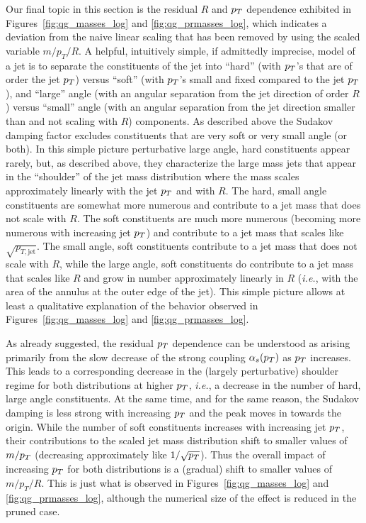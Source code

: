 Our final topic in this section is the residual $R$ and $p_T$ dependence exhibited in Figures~\ref{fig:qg_masses_log} and \ref{fig:qg_prmasses_log}, which
indicates a deviation from the naive linear scaling that has been removed by using the scaled variable $m/p_T/R$.  
A helpful, intuitively simple, if admittedly imprecise, model of a jet is to separate the constituents of the jet into ``hard'' (with $p_T$'s that are of order the jet 
$p_T$) versus ``soft'' (with $p_T$'s small and fixed compared to the jet $p_T$), and ``large'' angle (with an angular separation from the jet direction of order $R$)
versus ``small'' angle (with an angular separation from the jet direction smaller than and not scaling with $R$) components. 
As described above the Sudakov damping factor excludes constituents that are very soft or very small angle (or both).
In this simple picture 
perturbative large angle, hard constituents appear rarely, but, as described above, they characterize the large mass jets that appear in the
``shoulder'' of the jet mass distribution where the mass scales approximately linearly with the jet $p_T$ and with $R$.  
The hard, small angle constituents are somewhat more numerous
and contribute to a jet mass that does not scale with $R$.  The soft constituents are much more numerous (becoming more numerous
with increasing jet $p_T$) and contribute to a jet mass that scales like
$\sqrt{p_{T,\text{jet}}}$.  The small angle, soft constituents contribute to a jet mass that does not scale with $R$, while the large angle, soft
constituents do contribute to a jet mass that scales like $R$  and grow in number approximately linearly in $R$ (\textit{i.e.}, with the area
of the annulus at the outer edge of the jet).  This simple picture allows at least a qualitative explanation of the behavior observed in 
Figures~\ref{fig:qg_masses_log} and \ref{fig:qg_prmasses_log}.
    
As already suggested, the residual $p_T$ dependence can be understood as arising primarily from the slow decrease of the strong coupling $\alpha_s(p_T)$ as $p_T$ increases.  This leads to a corresponding decrease in the (largely perturbative) shoulder regime for both distributions
at higher $p_T$, \textit{i.e.}, a decrease in the number of hard, large angle constituents.  
At the same time, and for the same reason, the Sudakov damping is less strong with increasing $p_T$ and the peak moves in towards the origin.
While the number of soft constituents increases with increasing jet $p_T$, their contributions to the scaled jet mass distribution shift to smaller
values of $m/p_T$ (decreasing approximately like $1/\sqrt{p_T}$).
Thus the overall impact of increasing $p_T$ for both distributions is a (gradual) shift to smaller values of $m/p_T/R$.  This is just what is observed in 
Figures~\ref{fig:qg_masses_log} and \ref{fig:qg_prmasses_log}, although the numerical size of the effect is reduced in the pruned case.

